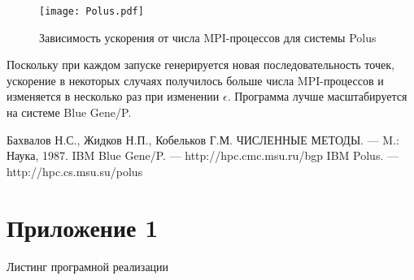 \documentclass[oneside, final, 12pt]{extarticle}
\newlength{\mygraphwidth}\setlength{\mygraphwidth}{1.0\textwidth}
\begin{document}
\begin{figure}[H]
    \centering
    \texttt{[image: Polus.pdf]}
    \caption{Зависимость ускорения от числа MPI-процессов для системы Polus}
\end{figure}

Поскольку при каждом запуске генерируется новая последовательность точек, ускорение в некоторых случаях получилось больше числа MPI-процессов и изменяется в несколько раз при изменении $ \epsilon $.
Программа лучше масштабируется на системе Blue Gene/P.

\begin{thebibliography}{3}
    Бахвалов Н.С., Жидков Н.П., Кобельков Г.М. ЧИСЛЕННЫЕ МЕТОДЫ. --- M.: Наука, 1987.
    IBM Blue Gene/P. --- http://hpc.cmc.msu.ru/bgp
    IBM Polus. --- http://hpc.cs.msu.su/polus
\end{thebibliography}

\section*{Приложение 1}

Листинг програмной реализации
\end{document}
